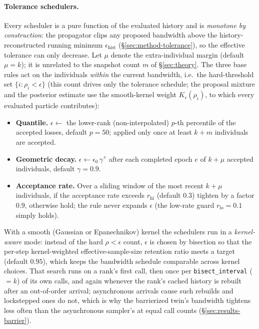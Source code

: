 \documentclass[10pt]{article}
\theoremstyle{plain}
\theoremstyle{definition}
\begin{document}
\paragraph{Tolerance schedulers.} Every scheduler is a pure function of the evaluated history and is \emph{monotone by construction}: the propagator clips any proposed bandwidth above the history-reconstructed running minimum $\epsilon_{\text{hist}}$ (\S\ref{sec:method-tolerance}), so the effective tolerance can only decrease. Let $\mu$ denote the extra-individual margin (default $\mu=k$); it is unrelated to the snapshot count $m$ of \S\ref{sec:theory}. The three base rules act on the individuals \emph{within} the current bandwidth, i.e.\ the hard-threshold set $\{i:\rho_i<\epsilon\}$ (this count drives only the tolerance schedule; the proposal mixture and the posterior estimate use the smooth-kernel weight $K_\epsilon(\rho_i)$, to which every evaluated particle contributes):
\begin{itemize}
\item \textbf{Quantile.} $\epsilon \leftarrow$ the lower-rank (non-interpolated) $p$-th percentile of the accepted losses, default $p=50$; applied only once at least $k+m$ individuals are accepted.
\item \textbf{Geometric decay.} $\epsilon \leftarrow \epsilon_0\,\gamma^{\,e}$ after each completed epoch $e$ of $k+\mu$ accepted individuals, default $\gamma=0.9$.
\item \textbf{Acceptance rate.} Over a sliding window of the most recent $k+\mu$ individuals, if the acceptance rate exceeds $r_{\text{hi}}$ (default $0.3$) tighten by a factor $0.9$, otherwise hold; the rule never expands $\epsilon$ (the low-rate guard $r_{\text{lo}}=0.1$ simply holds).
\end{itemize}
With a smooth (Gaussian or Epanechnikov) kernel the schedulers run in a \emph{kernel-aware} mode: instead of the hard $\rho<\epsilon$ count, $\epsilon$ is chosen by bisection so that the per-step kernel-weighted effective-sample-size retention ratio meets a target (default $0.95$), which keeps the bandwidth schedule comparable across kernel choices. That search runs on a rank's first call, then once per \texttt{bisect\_interval} ($=k$) of its own calls, and again whenever the rank's cached history is rebuilt after an out-of-order arrival; asynchronous arrivals cause such rebuilds and lockstepped ones do not, which is why the barrierized twin's bandwidth tightens less often than the asynchronous sampler's at equal call counts (\S\ref{sec:results-barrier}).
\end{document}

